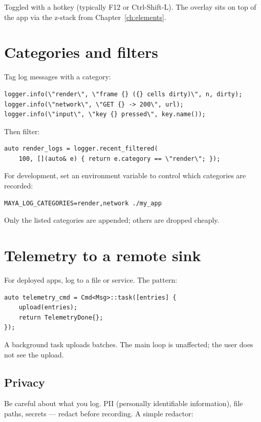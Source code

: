 Toggled with a hotkey (typically F12 or Ctrl-Shift-L). The
overlay sits on top of the app via the z-stack from
Chapter~\ref{ch:elements}.

\section{Categories and filters}

Tag log messages with a category:

\begin{lstlisting}
logger.info(\"render\", \"frame {} ({} cells dirty)\", n, dirty);
logger.info(\"network\", \"GET {} -> 200\", url);
logger.info(\"input\", \"key {} pressed\", key.name());
\end{lstlisting}

Then filter:

\begin{lstlisting}
auto render_logs = logger.recent_filtered(
    100, [](auto& e) { return e.category == \"render\"; });
\end{lstlisting}

For development, set an environment variable to control which
categories are recorded:

\begin{lstlisting}
MAYA_LOG_CATEGORIES=render,network ./my_app
\end{lstlisting}

Only the listed categories are appended; others are dropped
cheaply.

\section{Telemetry to a remote sink}

For deployed apps, log to a file or service. The pattern:

\begin{lstlisting}
auto telemetry_cmd = Cmd<Msg>::task([entries] {
    upload(entries);
    return TelemetryDone{};
});
\end{lstlisting}

A background task uploads batches. The main loop is unaffected;
the user does not see the upload.

\subsection*{Privacy}

Be careful about what you log. PII (personally identifiable
information), file paths, secrets --- redact before recording.
A simple redactor:

